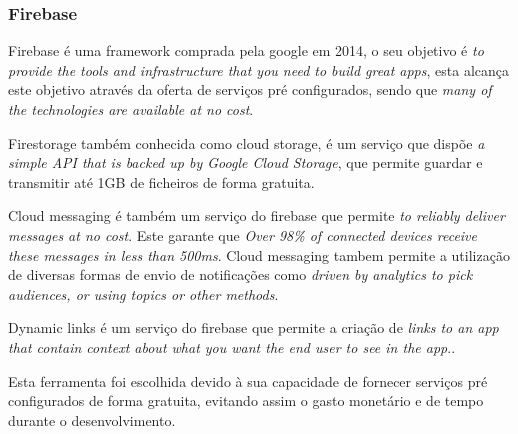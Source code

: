 \subsubsection{Firebase}
Firebase é uma framework comprada pela google em 2014, o seu objetivo é \emph{to provide the tools and infrastructure that you need to build great apps}\citep{Moroney2017}, esta alcança este objetivo através da oferta de serviços pré configurados, sendo que \emph{many of the technologies are available at no cost}\citep{Moroney2017}.

Firestorage também conhecida como cloud storage, é um serviço que dispõe \emph{a simple API that is backed up by Google Cloud Storage}\citep{Moroney2017}, que permite guardar e transmitir até 1GB de ficheiros de forma gratuita.

Cloud messaging é também um serviço do firebase que permite \emph{to reliably deliver messages at no cost}\citep{Moroney2017}. Este garante que \emph{Over 98\% of connected devices receive these messages in less than 500ms}\citep{Moroney2017}. Cloud messaging tambem permite a utilização de diversas formas de envio de notificações como \emph{driven by analytics to pick audiences, or using topics or other methods}\citep{Moroney2017}.

Dynamic links é um serviço do firebase que permite a criação de \emph{links to an app that contain context about what you want the end user to see in the app}\citep{Moroney2017}..

Esta ferramenta foi escolhida devido à sua capacidade de fornecer serviços pré configurados de forma gratuita, evitando assim o gasto monetário e de tempo durante o desenvolvimento.